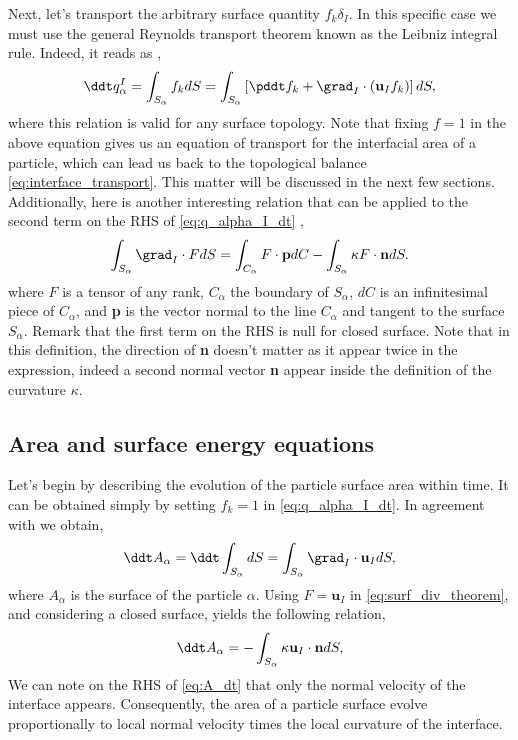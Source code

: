 Next, let's transport the arbitrary surface quantity $f_k \delta_I$.
In this specific case we must use the general Reynolds transport theorem known as the Leibniz integral rule. 
Indeed, it reads as \citep[Appendix B]{morel2015mathematical}, 
\begin{equation}
    \ddt  q^I_\alpha
    = \int_{S_\alpha} f_k dS 
    = \int_{S_\alpha} \left[
        \pddt f_k 
        +   \grad_I \cdot (\textbf{u}_If_k)
    \right]dS,
    \label{eq:q_alpha_I_dt}
\end{equation}
where this relation is valid for any surface topology. 
Note that fixing $f=1$ in the above equation gives us an equation of transport for the interfacial area of a particle, which can lead us back to the topological balance \ref{eq:interface_transport}. 
This matter will be discussed in the next few sections. 
Additionally, here is another interesting relation that can be applied to the second term on the RHS of \ref{eq:q_alpha_I_dt} \citep[Appendix B]{tryggvason2011direct}, 
\begin{equation}
    \int_{S_\alpha}  \grad_I  \cdot F dS
    = \int_{C_\alpha} F \cdot \textbf{p} dC
    - \int_{S_\alpha} \kappa F \cdot \textbf{n} dS. 
    \label{eq:surf_div_theorem}
\end{equation}
where $F$ is a tensor of any rank, $C_\alpha$ the boundary of $S_\alpha$, $dC$ is an infinitesimal piece of $C_\alpha$, and \textbf{p} is the vector normal to the line $C_\alpha$ and tangent to the surface $S_\alpha$.
Remark that the first term on the RHS is null for closed surface. 
Note that in this definition, the direction of \textbf{n} doesn't matter as it appear twice in the expression, indeed a second normal vector \textbf{n} appear inside the definition of the curvature $\kappa$. 

\subsection{Area and surface energy equations}

Let's begin by describing the evolution of the particle surface area within time.
It can be obtained simply by setting $f_k = 1$ in \ref{eq:q_alpha_I_dt}.  
In agreement with \citet{morel2007surface} we obtain,  
\begin{equation*}
    \ddt A_\alpha
    = \ddt \int_{S_\alpha} dS
    = \int_{S_\alpha} \grad_I \cdot \textbf{u}_I dS,
\end{equation*}
where $A_\alpha$ is the surface of the particle $\alpha$. 
Using $F = \textbf{u}_I$ in \ref{eq:surf_div_theorem}, and considering a closed surface, yields the following relation, 
\begin{equation}
    \ddt A_\alpha
    = - \int_{S_\alpha} \kappa \textbf{u}_I \cdot \textbf{n} dS,
    \label{eq:A_dt}
\end{equation}
We can note on the RHS of \ref{eq:A_dt} that only the normal velocity of the interface appears.
Consequently, the area of a particle surface evolve proportionally to local normal velocity times the local curvature of the interface. 

